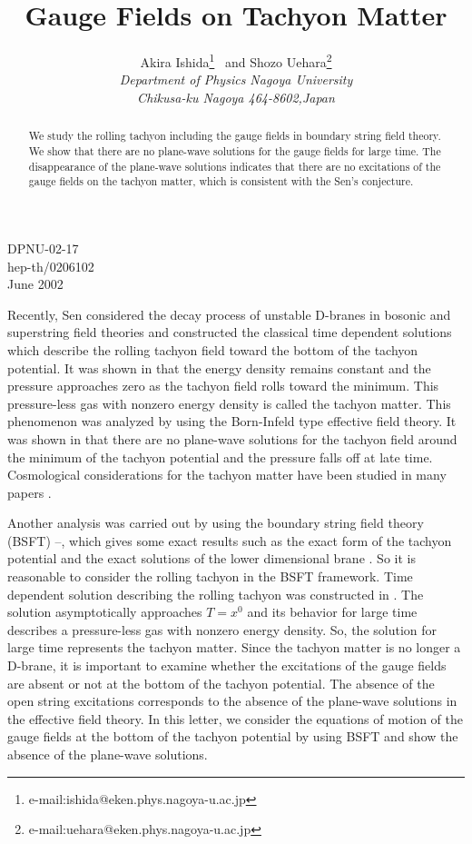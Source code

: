 \documentclass[12pt,a4paper]{article}
\title{Gauge Fields on Tachyon Matter}
\author{
{\sc Akira Ishida}\footnote{e-mail:ishida@eken.phys.nagoya-u.ac.jp}~
and
{\sc Shozo Uehara}\footnote{e-mail:uehara@eken.phys.nagoya-u.ac.jp}
\vspace{3mm}\\
{\sl Department of Physics Nagoya University}\\
{\sl Chikusa-ku Nagoya 464-8602,Japan}}
\date{}
\begin{document}
\maketitle
\vspace{-87mm}
\begin{flushright}
DPNU-02-17\\ hep-th/0206102\\ June 2002
\end{flushright}
\vspace{55mm}

\maketitle
\begin{abstract}
We study the rolling tachyon including the gauge fields
in boundary string field theory.
We show that there are no plane-wave solutions for the gauge fields
for large time.
The disappearance of the plane-wave solutions indicates
that there are no excitations of the gauge fields
on the tachyon matter, which is consistent with the Sen's conjecture.
\end{abstract}

Recently, Sen \cite{Sen1,Sen2} considered the decay process of
unstable D-branes in bosonic and superstring field theories and
constructed the classical time dependent solutions which describe the
rolling tachyon field toward the bottom of the tachyon potential.
It was shown in \cite{Sen2} that the energy density remains constant
and the pressure approaches zero as the tachyon field rolls toward the
minimum.
This pressure-less gas with nonzero energy density is called the
tachyon matter.
This phenomenon was analyzed by using the Born-Infeld type effective
field theory. It was shown in \cite{Sen3} that there are no plane-wave
solutions for the tachyon field around the minimum of the tachyon
potential and the pressure falls off at late time.
Cosmological considerations for the tachyon matter have been studied
in many papers \cite{cosmology}.

Another analysis was carried out by using the boundary string field
theory (BSFT) \cite{BSFT}--\cite{NP}, which gives some exact results
such as the exact form of the tachyon potential and the exact
solutions of the lower dimensional brane \cite{KMM1,KMM2}.
So it is reasonable to consider the rolling tachyon in the BSFT
framework. Time dependent solution describing the rolling tachyon
was constructed in \cite{ST,Mi}. The solution asymptotically
approaches $T=x^0$ and its behavior for large time describes a
pressure-less gas with nonzero energy density. So, the solution for
large time represents the tachyon matter.
Since the tachyon matter is no longer a D-brane,
it is important to examine whether the excitations of the gauge fields
are absent or not at the bottom of the tachyon potential.
The absence of the open string excitations corresponds to
the absence of the plane-wave solutions in the effective field theory.
In this letter, we consider the equations of motion of the gauge
fields at the bottom of the tachyon potential by using BSFT
and show the absence of the plane-wave solutions.
\end{document}

